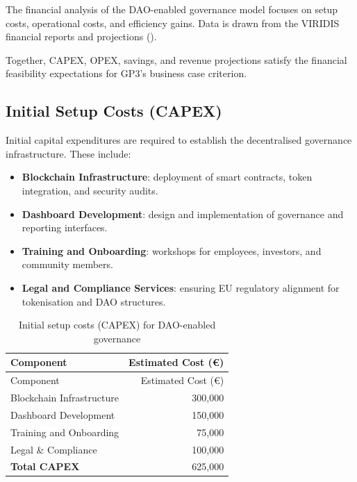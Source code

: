 \documentclass[
  english,
  12pt,
  oneside,
  open=any]{scrbook}
\providecommand{\tightlist}{%
  \setlength{\itemsep}{0pt}\setlength{\parskip}{0pt}}\usepackage{longtable,booktabs,array}
\begin{document}
The financial analysis of the DAO-enabled governance model focuses on
setup costs, operational costs, and efficiency gains. Data is drawn from
the VIRIDIS financial reports and projections
().

Together, CAPEX, OPEX, savings, and revenue projections satisfy the
financial feasibility expectations for GP3's business case criterion.

\subsection{Initial Setup Costs (CAPEX)}\label{sec-capex}

Initial capital expenditures are required to establish the decentralised
governance infrastructure. These include:

\begin{itemize}
\tightlist
\item
  \textbf{Blockchain Infrastructure}: deployment of smart contracts,
  token integration, and security audits.\\
\item
  \textbf{Dashboard Development}: design and implementation of
  governance and reporting interfaces.\\
\item
  \textbf{Training and Onboarding}: workshops for employees, investors,
  and community members.\\
\item
  \textbf{Legal and Compliance Services}: ensuring EU regulatory
  alignment for tokenisation and DAO structures.
\end{itemize}

\begin{longtable}[]{@{}lr@{}}
\caption{Initial setup costs (CAPEX) for DAO-enabled
governance}\label{tbl-capex}\tabularnewline
\toprule\noalign{}
Component & Estimated Cost (€) \\
\midrule\noalign{}
\endfirsthead
\toprule\noalign{}
Component & Estimated Cost (€) \\
\midrule\noalign{}
\endhead
\bottomrule\noalign{}
\endlastfoot
Blockchain Infrastructure & 300,000 \\
Dashboard Development & 150,000 \\
Training and Onboarding & 75,000 \\
Legal \& Compliance & 100,000 \\
\textbf{Total CAPEX} & 625,000 \\
\end{longtable}
\end{document}

